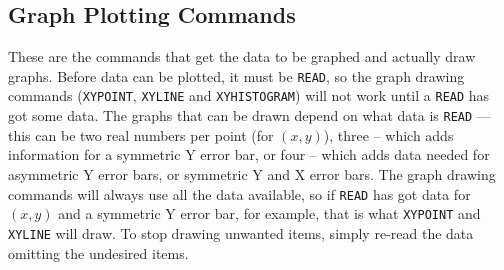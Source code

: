 \documentclass[a4paper,twoside,11pt]{article}
\begin{document}
\subsection{Graph Plotting Commands}
These are the commands that get the data to be graphed and actually draw graphs. Before data
can be plotted, it must be \texttt{READ}, so the graph drawing commands 
(\texttt{XYPOINT}, \texttt{XYLINE} and \texttt{XYHISTOGRAM})
will not work until a \texttt{READ} has got some data. The graphs that can be drawn depend on what
data is \texttt{READ} --- this can be two real numbers per point (for $(x,y)$), three -- which adds 
information for a symmetric Y error bar, or four -- which adds data needed for asymmetric Y
error bars, or symmetric Y and X error bars. The graph drawing commands will always use all
the data available, so if \texttt{READ} has got data for $(x,y)$ and a symmetric Y error bar, for example,
that is what \texttt{XYPOINT} and \texttt{XYLINE} will draw. To stop drawing unwanted items, simply re-read the
data omitting the undesired items.
\end{document}
